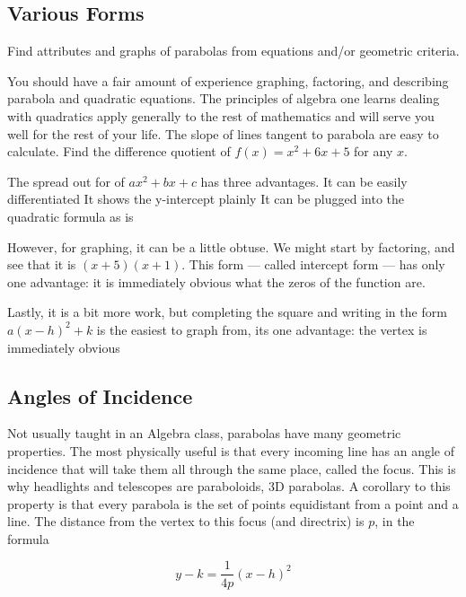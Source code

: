 
\subsection{Various Forms}
\begin{objective}
Find attributes and graphs of parabolas from equations and/or geometric criteria.
\end{objective}

You should have a fair amount of experience graphing, factoring, and describing
parabola and quadratic equations.  The principles of algebra one learns dealing with quadratics
apply generally to the rest of mathematics and will serve you well for the rest of your life.
The slope of lines tangent to parabola are easy to calculate.
Find the difference quotient of $f(x)=x^2+6x+5$ for any $x$.


The spread out for of $ax^2+bx+c$ has three advantages.  
It can be easily differentiated
It shows the y-intercept plainly
It can be plugged into the quadratic formula as is

However, for graphing, it can be a little obtuse.  We might start by factoring, and see that it is
$(x+5)(x+1)$.  This form --- called intercept form --- 
has only one advantage: it is immediately obvious what the zeros of the function are.

Lastly, it is a bit more work, but completing the square and writing in the form $a(x-h)^2+k$
is the easiest to graph from, its one advantage:
the vertex is immediately obvious

\subsection{Angles of Incidence}
Not usually taught in an Algebra class, parabolas have many geometric properties.  The most
physically useful is that every incoming line has an angle of incidence that will take them all
through the same place, called the focus.  This is why headlights and telescopes are paraboloids,
3D parabolas.  A corollary to this property is that every parabola is the set of points equidistant 
from a point and a line.  The distance from the vertex to this focus (and directrix) is $p$, in the
formula

$$
y-k = \frac{1}{4p}(x-h)^2
$$

~\vfill